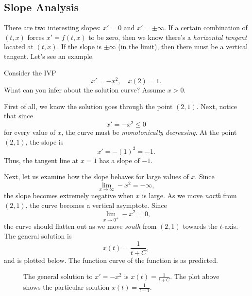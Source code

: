 \documentclass[10pt,letterpaper]{article}
\begin{document}

\subsection{Slope Analysis}
There are two interesting slopes: $x'=0$ and $x'=\pm\infty$. If a certain combination of $(t,x)$ forces $x'=f(t,x)$ to be zero, then we know there's a \textit{horizontal tangent} located at $(t,x)$. If the slope is $\pm\infty$ (in the limit), then there must be a vertical tangent. Let's see an example. 


\begin{example}[4]{

Consider the IVP
\[
x'=-x^2, \quad x(2)=1.
\]
What can you infer about the solution curve? Assume $x>0$. 
}
\vspace{1em}

First of all, we know the solution goes through the point $(2,1)$. Next, notice that since
\[
x'=-x^2 \leq 0
\]
for every value of $x$, the curve must be \textit{monotonically decreasing}. At the point $(2,1)$, the slope is
\[
x' = -(1)^2 = -1.
\]
Thus, the tangent line at $x=1$ has a slope of $-1$.

Next, let us examine how the slope behaves for large values of $x$. Since
\[
\lim_{x\to\infty} -x^2 = -\infty,
\]
the slope becomes extremely negative when $x$ is large. As we move \emph{north} from $(2,1)$, the curve becomes a vertical asymptote. Since
\[
\lim_{x\to 0^+} -x^2 = 0,
\]
the curve should flatten out as we move \emph{south} from $(2,1)$ towards the $t$-axis. The general solution is
\[
x(t)=\frac{1}{t+C},
\]
and is plotted below. The function curve of the function is as predicted.

\begin{figure}[H]
\centering
{}
\caption{The general solution to $x'=-x^2$ is $x(t)=\frac{1}{t+C}$. The plot above shows the particular solution $x(t) = \frac{1}{t-1}$.}
\end{figure}
\end{example}
\end{document}
